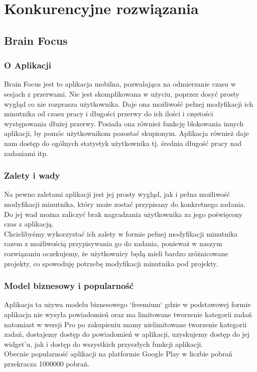 \documentclass[a4paper,11pt]{report}
\begin{document}
\section {Konkurencyjne rozwiązania}
\subsection{Brain Focus}
\subsubsection{O Aplikacji}
Brain Focus jest to aplikacja mobilna, pozwalająca na odmierzanie czasu w sesjach z przerwami.
 Nie jest skomplikowana w użyciu, poprzez dosyć prosty wygląd co nie rozprasza użytkownika.
 Daje ona możliwość pełnej modyfikacji ich minutnika od czasu pracy i długości przerwy do ich ilości i częstości występowania dłużej przerwy.
 Posiada ona również funkcję blokowania innych aplikacji, by pomóc użytkownikom pozostać skupionym.
 Aplikacja również daje nam dostęp do ogólnych statystyk użytkownika tj. średnia długość pracy nad zadaniami itp.
\subsubsection{Zalety i wady}
Na pewno zaletami aplikacji jest jej prosty wygląd,
 jak i pełna możliwość modyfikacji minutnika,
 który może zostać przypisany do konkretnego zadania.
\vspace{0,5cm}
 \\Do jej wad można zaliczyć brak nagradzania użytkownika za jego poświęcony czas z aplikacją.
\vspace{0,5cm}
\\Chcielibyśmy wykorzystać ich zalety w formie pełnej modyfikacji minutnika razem z możliwością przypisywania go do zadania,
 ponieważ w naszym rozwiązaniu oczekujemy,
 że użytkownicy będą mieli bardzo zróżnicowane projekty, co spowoduję potrzebę modyfikacji minutnika pod projekty.
\subsubsection{Model biznesowy i popularność}
Aplikacja ta używa modelu biznesowego `freemium` gdzie w podstawowej formie aplikacja nie wysyła powiadomień
 oraz ma limitowane tworzenie kategorii zadań natomiast w wersji Pro
 po zakupieniu mamy nielimitowane tworzenie kategorii zadań,
 dostajemy dostęp do powiadomień w aplikacji,
 uzyskujemy dostęp do jej widget'u,
 jak i dostęp do wszystkich przyszłych funkcji aplikacji.
\vspace{0,5cm}\\Obecnie popularność aplikacji na platformie Google Play w liczbie pobrań przekracza 1000000 pobrań.
\end{document}
